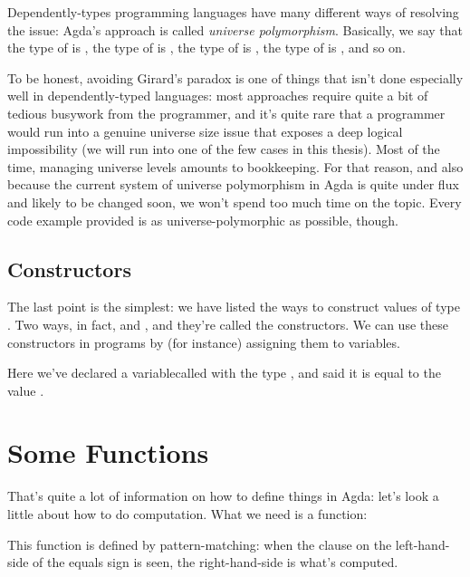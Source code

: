 Dependently-types programming languages have many different ways of resolving
the issue: Agda's approach is called \emph{universe polymorphism}.
Basically, we say that the type of  is
, the type of  is
, the type of 
is , the type of 
is , and so on.

To be honest, avoiding Girard's paradox is one of things that isn't done
especially well in dependently-typed languages: most approaches require quite a
bit of tedious busywork from the programmer, and it's quite rare that a
programmer would run into a genuine universe size issue that exposes a deep
logical impossibility (we will run into one of the few cases in this thesis).
Most of the time, managing universe levels amounts to bookkeeping.
For that reason, and also because the current system of universe polymorphism in
Agda is quite under flux and likely to be changed soon, we won't spend too much
time on the topic.
Every code example provided is as universe-polymorphic as possible, though.

\subsection{Constructors}
The last point is the simplest: we have listed the ways to construct values of
type .
Two ways, in fact,  and
, and they're called the constructors.
We can use these constructors in programs by (for instance) assigning them to
variables.
\begin{multicols}{2}\centering
  \columnbreak
\end{multicols}\vspace{-2\baselineskip}\noindent
Here we've declared a variable\footnotemark\;called  with
the type , and said it is equal to the value
.


\section{Some Functions}
That's quite a lot of information on how to define things in Agda: let's look a
little about how to do computation.
What we need is a function:
\begin{multicols}{2}\centering
  \columnbreak
\end{multicols}\vspace{-2\baselineskip}\noindent
This function is defined by pattern-matching: when the clause on the
left-hand-side of the equals sign is seen, the right-hand-side is what's
computed.

